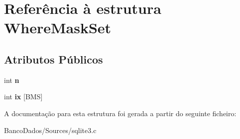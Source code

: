 \hypertarget{struct_where_mask_set}{\section{Referência à estrutura Where\-Mask\-Set}
\label{struct_where_mask_set}
}
\subsection*{Atributos Públicos}
\begin{DoxyCompactItemize}
\item 
\hypertarget{struct_where_mask_set_a09923e1dee2157c78c5ae0df65e8ee7c}{int {\bfseries n}}\label{struct_where_mask_set_a09923e1dee2157c78c5ae0df65e8ee7c}

\item 
\hypertarget{struct_where_mask_set_a9de4e7b27d4f793f37c1ead7b44ecb48}{int {\bfseries ix} \mbox{[}B\-M\-S\mbox{]}}\label{struct_where_mask_set_a9de4e7b27d4f793f37c1ead7b44ecb48}

\end{DoxyCompactItemize}


A documentação para esta estrutura foi gerada a partir do seguinte ficheiro\-:\begin{DoxyCompactItemize}
\item 
Banco\-Dados/\-Sources/sqlite3.\-c\end{DoxyCompactItemize}

